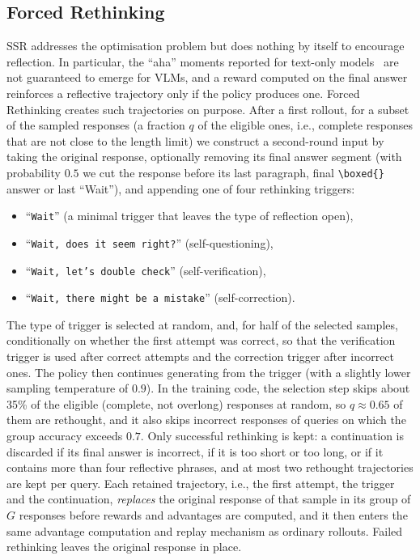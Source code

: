 \documentclass{article}
\begin{document}
\subsection{Forced Rethinking}
\label{sec:forced}

SSR addresses the optimisation problem but does nothing by itself to encourage reflection. In particular, the ``aha'' moments reported for text-only models~\citep{deepseek-r1} are not guaranteed to emerge for VLMs, and a reward computed on the final answer reinforces a reflective trajectory only if the policy produces one. Forced Rethinking creates such trajectories on purpose. After a first rollout, for a subset of the sampled responses (a fraction $q$ of the eligible ones, i.e., complete responses that are not close to the length limit) we construct a second-round input by taking the original response, optionally removing its final answer segment (with probability $0.5$ we cut the response before its last paragraph, final \texttt{\textbackslash boxed\{\}} answer or last ``Wait''), and appending one of four rethinking triggers:
\begin{itemize}[leftmargin=*,topsep=2pt,itemsep=1pt]
\item ``\texttt{Wait}'' (a minimal trigger that leaves the type of reflection open),
\item ``\texttt{Wait, does it seem right?}'' (self-questioning),
\item ``\texttt{Wait, let's double check}'' (self-verification),
\item ``\texttt{Wait, there might be a mistake}'' (self-correction).
\end{itemize}
The type of trigger is selected at random, and, for half of the selected samples, conditionally on whether the first attempt was correct, so that the verification trigger is used after correct attempts and the correction trigger after incorrect ones. The policy then continues generating from the trigger (with a slightly lower sampling temperature of $0.9$). In the training code, the selection step skips about 35\% of the eligible (complete, not overlong) responses at random, so $q\approx 0.65$ of them are rethought, and it also skips incorrect responses of queries on which the group accuracy exceeds $0.7$. Only successful rethinking is kept: a continuation is discarded if its final answer is incorrect, if it is too short or too long, or if it contains more than four reflective phrases, and at most two rethought trajectories are kept per query. Each retained trajectory, i.e., the first attempt, the trigger and the continuation, \emph{replaces} the original response of that sample in its group of $G$ responses before rewards and advantages are computed, and it then enters the same advantage computation and replay mechanism as ordinary rollouts. Failed rethinking leaves the original response in place.
\end{document}
